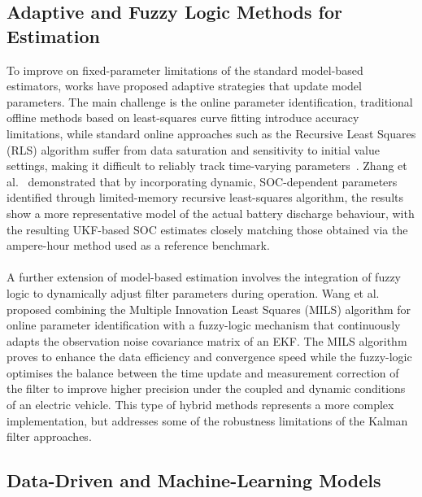 \subsection{Adaptive and Fuzzy Logic Methods for Estimation}

To improve on fixed-parameter limitations of the standard model-based estimators, works have proposed adaptive strategies
that update model parameters. The main challenge is the online parameter identification, traditional offline methods based on least-squares 
curve fitting introduce accuracy limitations, while standard online approaches such as the Recursive Least Squares (\acs{RLS}) 
algorithm suffer from data saturation and sensitivity to initial value settings, making it difficult 
to reliably track time-varying parameters~\cite{Wang2025LithiumIonBS}.
Zhang et al.~\cite{UKFDynamPar} demonstrated that by incorporating dynamic, \acs{SOC}-dependent parameters identified through limited-memory 
recursive least-squares algorithm, the results show a more representative model of the actual battery discharge behaviour, with
the resulting \acs{UKF}-based \acs{SOC} estimates closely matching those obtained via the ampere-hour method used as a reference benchmark.
\\
\\
A further extension of model-based estimation involves the integration of fuzzy logic to dynamically adjust 
filter parameters during operation. Wang et al.~\cite{Wang2025LithiumIonBS} proposed combining the 
Multiple Innovation Least Squares (\acs{MILS}) algorithm for online parameter 
identification with a fuzzy-logic mechanism that continuously adapts the observation noise covariance matrix of an \acs{EKF}. 
The \acs{MILS} algorithm proves to enhance the data efficiency and convergence speed while the fuzzy-logic optimises the balance
between the time update and measurement correction of the filter to improve higher precision under the coupled and dynamic conditions 
of an electric vehicle. This type of hybrid methods represents a more complex implementation, but addresses some of 
the robustness limitations of the Kalman filter approaches.

\subsection{Data-Driven and Machine-Learning Models}

